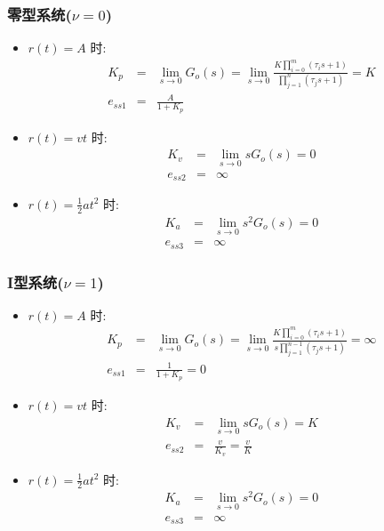 \documentclass{article}
\begin{document}
\begin{frame}
\frametitle{零型系统($\nu=0$)}
\label{sec-3-2-6}

\begin{itemize}
\item <2-> $r(t)=A$ 时:
      \begin{eqnarray*}
      K_p &=& \lim_{s\rightarrow 0}G_o(s) 
	  = \lim_{s\rightarrow 0}\frac{K\prod_{i=0}^m(\tau_i s+1)}{\prod_{j=1}^n (\tau_j s+1)} 
	  = K \\
      e_{ss1} &=& \frac{A}{1+K_p}
      \end{eqnarray*}
\item <3-> $r(t)=vt$ 时:
      \begin{eqnarray*}
      K_v &=& \lim_{s\rightarrow 0}sG_o(s) 
	  = 0 \\
      e_{ss2} &=& \infty 
      \end{eqnarray*}
\item <4> $r(t)=\frac{1}{2}at^2$ 时:
      \begin{eqnarray*}
      K_a &=& \lim_{s\rightarrow 0}s^2 G_o(s) 
	  = 0 \\
      e_{ss3} &=& \infty
      \end{eqnarray*}
\end{itemize}
\end{frame}
\begin{frame}
\frametitle{I型系统($\nu=1$)}
\label{sec-3-2-7}

\begin{itemize}
\item <2->$r(t)=A$ 时:
      \begin{eqnarray*}
      K_p &=& \lim_{s\rightarrow 0}G_o(s) 
	  = \lim_{s\rightarrow 0}\frac{K\prod_{i=0}^m(\tau_i s+1)}{s\prod_{j=1}^{n-1}(\tau_j s+1)} 
	  = \infty \\
      e_{ss1} &=& \frac{1}{1+K_p}
	    = 0
      \end{eqnarray*}
\item <3->$r(t)=vt$ 时:
      \begin{eqnarray*}
      K_v &=& \lim_{s\rightarrow 0}sG_o(s) 
	  = K \\
      e_{ss2} &=& \frac{v}{K_v} 
	      =\frac{v}{K}
      \end{eqnarray*}
\item <4->$r(t)=\frac{1}{2}at^2$ 时:
      \begin{eqnarray*}
      K_a &=& \lim_{s\rightarrow 0}s^2 G_o(s) 
	  = 0 \\
      e_{ss3} &=& \infty
      \end{eqnarray*}
\end{itemize}
\end{frame}
\end{document}
